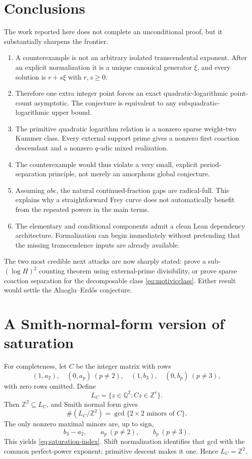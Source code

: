 \documentclass[11pt,oneside]{article}
\theoremstyle{definition}
\newcommand{\Z}{\mathbb Z}
\newcommand{\Q}{\mathbb Q}
\begin{document}
\section{Conclusions}

The work reported here does not complete an unconditional proof, but it substantially sharpens the frontier.

\begin{enumerate}
\item A counterexample is not an arbitrary isolated transcendental exponent.  After an explicit normalization it is a unique canonical generator $\xi$, and every solution is $r+s\xi$ with $r,s\ge0$.
\item Therefore one extra integer point forces an exact quadratic-logarithmic point-count asymptotic.  The conjecture is equivalent to any subquadratic-logarithmic upper bound.
\item The primitive quadratic logarithm relation is a nonzero sparse weight-two Kummer class.  Every external support prime gives a nonzero first coaction descendant and a nonzero $q$-adic mixed realization.
\item The counterexample would thus violate a very small, explicit period-separation principle, not merely an amorphous global conjecture.
\item Assuming $abc$, the natural continued-fraction gaps are radical-full.  This explains why a straightforward Frey curve does not automatically benefit from the repeated powers in the main terms.
\item The elementary and conditional components admit a clean Lean dependency architecture.  Formalization can begin immediately without pretending that the missing transcendence inputs are already available.
\end{enumerate}

The two most credible next attacks are now sharply stated: prove a sub-$(\log H)^2$ counting theorem using external-prime divisibility, or prove sparse coaction separation for the decomposable class \eqref{eq:motivicclass}.  Either result would settle the Alaoglu--Erd\H{o}s conjecture.

\appendix

\section{A Smith-normal-form version of saturation}

For completeness, let $C$ be the integer matrix with rows
\[
 (1,a_2),\quad(0,a_p)\ (p\ne2),\quad
 (1,b_3),\quad(0,b_p)\ (p\ne3),
\]
with zero rows omitted.  Define
\[
 L_C=\{z\in\Q^2:Cz\in\Z^r\}.
\]
Then $\Z^2\subseteq L_C$, and Smith normal form gives
\[
  \#(L_C/\Z^2)=\gcd\{\text{$2\times2$ minors of }C\}.
\]
The only nonzero maximal minors are, up to sign,
\[
  b_3-a_2,
  \qquad a_p\ (p\ne2),
  \qquad b_p\ (p\ne3).
\]
This yields \eqref{eq:saturation-index}.  Shift normalization identifies that gcd with the common perfect-power exponent; primitive descent makes it one.  Hence $L_C=\Z^2$.
\end{document}
